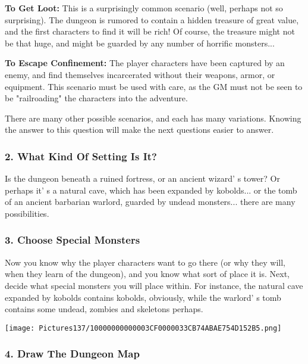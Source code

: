 \documentclass[a4paper,twoside,openany,10pt]{book}
\begin{document}
\begin{multicols}{2}
\textbf{To Get Loot:} This is a surprisingly common scenario (well, perhaps not so surprising). The dungeon is rumored to contain a hidden treasure of great value, and the first characters to find it will be rich! Of course, the treasure might not be that huge, and might be guarded by any number of horrific monsters...

\textbf{To Escape Confinement:} The player characters have been captured by an enemy, and find themselves incarcerated without their weapons, armor, or equipment. This scenario must be used with care, as the GM must not be seen to be "railroading" the characters into the adventure. 

There are many other possible scenarios, and each has many variations. Knowing the answer to this question will make the next questions easier to answer.

\subsubsection{2. What Kind Of Setting Is It?}\label{what-kind-of-setting-is-it}

Is the dungeon beneath a ruined fortress, or an ancient wizard' s tower? Or perhaps it' s a natural cave, which has been expanded by kobolds... or the tomb of an ancient barbarian warlord, guarded by undead monsters... there are many possibilities.

\subsubsection{3. Choose Special Monsters}\label{choose-special-monsters}

Now you know why the player characters want to go there (or why they will, when they learn of the dungeon), and you know what sort of place it is. Next, decide what special monsters you will place within. For instance, the natural cave expanded by kobolds contains kobolds, obviously, while the warlord' s tomb contains some undead, zombies and skeletons perhaps.

\begin{center}
	\texttt{[image: Pictures137/10000000000003CF0000033CB74ABAE754D152B5.png]}
\end{center}

\subsubsection{4. Draw The Dungeon Map}\label{draw-the-dungeon-map}


\end{multicols}
\end{document}
